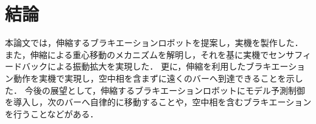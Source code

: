 \section{結論}
本論文では，伸縮するブラキエーションロボットを提案し，実機を製作した．
また，伸縮による重心移動のメカニズムを解明し，それを基に実機でセンサフィードバックによる振動拡大を実現した．
更に，伸縮を利用したブラキエーション動作を実機で実現し，空中相を含まずに遠くのバーへ到達できることを示した．
今後の展望として，伸縮するブラキエーションロボットにモデル予測制御を導入し，次のバーへ自律的に移動することや，空中相を含むブラキエーションを行うことなどがある．